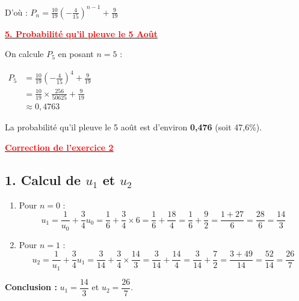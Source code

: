 \documentclass[12pt,a4paper]{article}
\begin{document}
D'où :
$ P_n = \frac{10}{19} \left( -\frac{4}{15} \right)^{n-1} + \frac{9}{19} $

\underline{\textbf{\textcolor{red}{5. Probabilité qu'il pleuve le 5 Août}}}

On calcule $P_5$ en posant $n=5$ :

                        $
                        \begin{aligned}
                        P_5 &= \frac{10}{19} \left( -\frac{4}{15} \right)^4 + \frac{9}{19}\\
                            &= \frac{10}{19} \times \frac{256}{50625} + \frac{9}{19}\\ 
                            &\approx 0,4763
                        \end{aligned}
                        $

La probabilité qu'il pleuve le 5 août est d'environ \textbf{0,476} (soit 47,6\%).

\vspace{3cm}
\underline{\textbf{\textcolor{red}{Correction de l'exercice 2}}}\\

\subsection*{1. Calcul de $u_1$ et $u_2$}
\begin{enumerate}
    \item Pour $n = 0$ : 
    \[ u_1 = \dfrac{1}{u_0} + \dfrac{3}{4}u_0 = \dfrac{1}{6} + \dfrac{3}{4} \times 6 = \dfrac{1}{6} + \dfrac{18}{4} = \dfrac{1}{6} + \dfrac{9}{2} = \dfrac{1 + 27}{6} = \dfrac{28}{6} = \dfrac{14}{3} \]
    \item Pour $n = 1$ : 
    \[ u_2 = \frac{1}{u_1} + \frac{3}{4}u_1 = \frac{3}{14} + \frac{3}{4} \times \frac{14}{3} = \frac{3}{14} + \frac{14}{4} = \frac{3}{14} + \frac{7}{2} = \frac{3 + 49}{14} = \frac{52}{14} = \frac{26}{7} \]
\end{enumerate}
\textbf{Conclusion :} $u_1 = \dfrac{14}{3}$ et $u_2 = \dfrac{26}{7}$.
\end{document}
